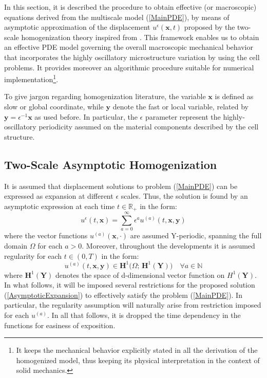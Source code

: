  In this section, it is described the procedure to obtain effective (or macroscopic) equations derived from the multiscale model (\ref{MainPDE}), by means of asymptotic approximation of the displacement $u^{\epsilon}(\mathbf{x},t)$ proposed by the two-scale homogenization theory inspired from \cite{altenbach2018generalized}. This framework enables us to obtain an effective PDE model governing the overall macroscopic mechanical behavior that incorporates the highly oscillatory microstructure variation by using the cell problems. It provides moreover an algorithmic procedure suitable for numerical implementation\footnote{It keeps the mechanical behavior explicitly stated in all the derivation of the homogenized model, thus keeping its physical interpretation in the context of solid mechanics.}.

To give jargon regarding homogenization literature, the variable $\mathbf{x}$ is defined as slow or global coordinate, while $\mathbf{y}$ denote the fast or local variable, related by $\mathbf{y} = \epsilon^{-1}\mathbf{x}$ as used before. In particular, the $\epsilon$ parameter represent the highly-oscillatory periodicity assumed on the material components described by the cell structure.

\subsection{Two-Scale Asymptotic Homogenization}
It is assumed that displacement solutions to problem (\ref{MainPDE}) can be expressed as expansion at different $\epsilon$ scales. Thus, the solution is found by an asymptotic expression at each time $t \in \mathbb{R}_+$ in the form:
\begin{equation}
    \label{AsymptoticExpansion}
    u^{\epsilon}(t, \mathbf{x}) = \sum_{a=0}^{\infty} \epsilon^a u^{(a)}(t, \mathbf{x},\mathbf{y}) 
\end{equation}
where the vector functions $u^{(a)}(\mathbf{x}, \cdot)$ are assumed Y-periodic, spanning the full domain $\Omega$ for each $a>0$. Moreover, throughout the developments it is assumed regularity for each $t \in (0,T)$ in the form:
\begin{equation*}
    u^{(a)}(t, \mathbf{x},\mathbf{y}) \in \mathbf{H}^1\big(\Omega; \, \mathbf{H}^1(\mathbf{Y})\big) \quad \forall a \in \mathbb{N}
\end{equation*}
where $\mathbf{H}^1(\mathbf{Y})$ denotes the space of d-dimensional vector function on $H^1(\mathbf{Y})$.
In what follows, it will be imposed several restrictions for the proposed solution (\ref{AsymptoticExpansion}) to effectively satisfy the problem (\ref{MainPDE}). In particular, the regularity assumption will naturally arise from restriction imposed for each $u^{(a)}$. In all that follows, it is dropped the time dependency in the functions for easiness of exposition.

